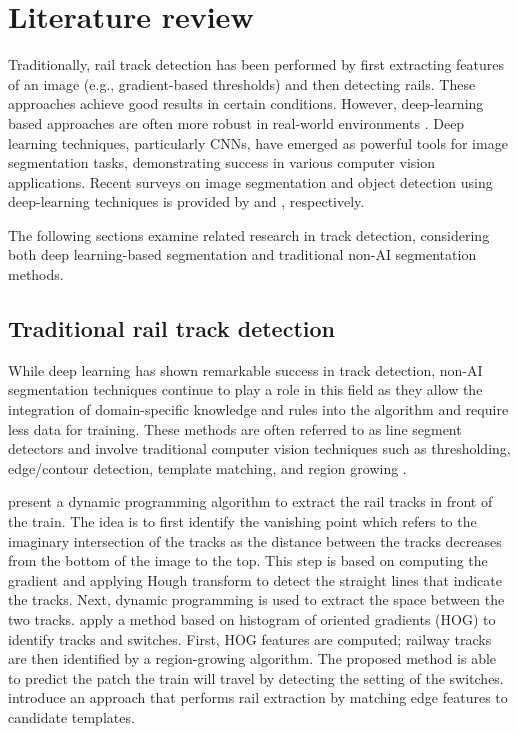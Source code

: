\documentclass[Master,MDS,english]{BASE/twbook} %
\begin{document}
\chapter{Literature review} %

Traditionally, rail track detection has been performed by first extracting features of an image (e.g., gradient-based thresholds) and then detecting rails. These approaches achieve good results in certain conditions. However, deep-learning based approaches are often more robust in real-world environments \citep{7350873, 8859360, 10.1145/3503161.3548050}.
Deep learning techniques, particularly CNNs, have emerged as powerful tools for image segmentation tasks, demonstrating success in various computer vision applications. Recent surveys on image segmentation and object detection using deep-learning techniques is provided by \cite{cmc.2023.032757} and \cite{ZAIDI2022103514}, respectively.

The following sections examine related research in track detection, considering both deep learning-based segmentation and traditional non-AI segmentation methods.



\section{Traditional rail track detection}

While deep learning has shown remarkable success in track detection, non-AI segmentation techniques continue to play a role in this field as they allow the integration of domain-specific knowledge and rules into the algorithm and require less data for training. These methods are often referred to as line segment detectors and involve traditional computer vision techniques such as thresholding, edge/contour detection, template matching, and region growing \citep{4731268, ipol.2012.gjmr-lsd, 8100103, SAHOO1988233, Mittal2022}.

\cite{5309526} present a dynamic programming algorithm to extract the rail tracks in front of the train. The idea is to first identify the vanishing point which refers to the imaginary intersection of the tracks as the distance between the tracks decreases from the bottom of the image to the top.  This step is based on computing the gradient and applying Hough transform to detect the straight lines that indicate the tracks. Next, dynamic programming is used to extract the space between the two tracks.
 \cite{qi2013efficient} apply a method based on histogram of oriented gradients (HOG) to identify tracks and switches. First, HOG features are computed;  railway tracks are then identified by a region-growing algorithm. The proposed method is able to predict the patch the train will travel by detecting the setting of the switches. 
\cite{5940410} introduce an approach that performs rail extraction by matching edge features to candidate templates.
\end{document}
